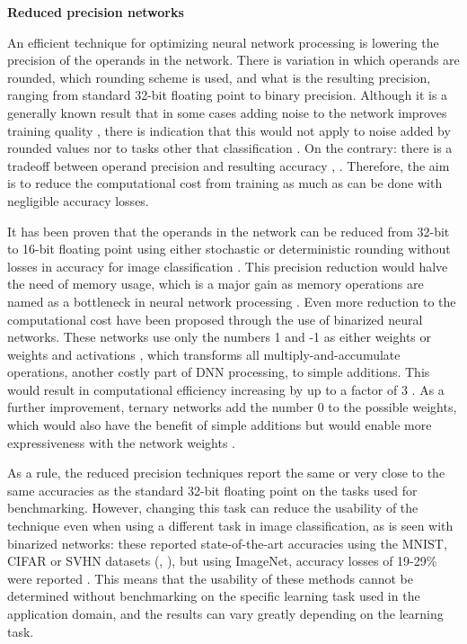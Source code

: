 \textbf{Reduced precision networks}

An efficient technique for optimizing neural network processing is lowering the precision of the operands in the network. There is variation in which operands are rounded, which rounding scheme is used, and what is the resulting precision, ranging from standard 32-bit floating point to binary precision. Although it is a generally known result that in some cases adding noise to the network improves training quality \cite{murray_enhanced_1994}, there is indication that this would not apply to noise added by rounded values \cite{murray_enhanced_1994} nor to tasks other that classification \cite{an_effects_1996}. On the contrary: there is a tradeoff between operand precision and resulting accuracy \cite{de_sa_high-accuracy_2018}, \cite{courbariaux_training_2015}. Therefore, the aim is to reduce the computational cost from training as much as can be done with negligible accuracy losses.

It has been proven that the operands in the network can be reduced from 32-bit to 16-bit floating point using either stochastic or deterministic rounding without losses in accuracy for image classification \cite{pmlr-v37-gupta15} \cite{micikevicius_mixed_2018}. This precision reduction would halve the need of memory usage, which is a major gain as memory operations are named as a bottleneck in neural network processing \cite{szeEfficientProcessingDeep2017}. Even more reduction to the computational cost have been proposed through the use of binarized neural networks. These networks use only the numbers 1 and -1 as either weights \cite{courbariaux_binaryconnect_2016} or weights and activations \cite{courbariaux_binarized_2016},  which transforms all multiply-and-accumulate operations, another costly part of DNN processing, to simple additions. This would result in computational efficiency increasing by up to a factor of 3 \cite{courbariaux_binaryconnect_2016}. As a further improvement, ternary networks add the number 0 to the possible weights, which would also have the benefit of simple additions but would enable more expressiveness with the network weights \cite{li_ternary_2016}.

As a rule, the reduced precision techniques report the same or very close to the same accuracies as the standard 32-bit floating point on the tasks used for benchmarking. However, changing this task can reduce the usability of the technique even when using a different task in image classification, as is seen with binarized networks: these reported state-of-the-art accuracies using the MNIST, CIFAR or SVHN datasets (\cite{courbariaux_binarized_2016}, \cite{courbariaux_binaryconnect_2016}), but using ImageNet, accuracy losses of 19-29\% were reported \cite{leibe_xnor-net_2016}. This means that the usability of these methods cannot be determined without benchmarking on the specific learning task used in the application domain, and the results can vary greatly depending on the learning task.

